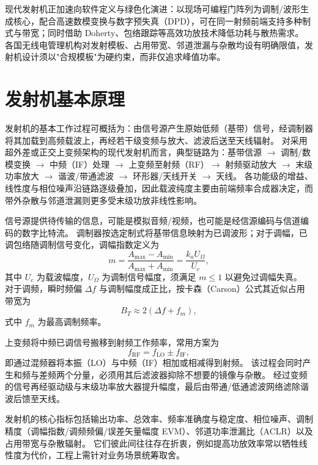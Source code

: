 现代发射机正加速向软件定义与绿色化演进：以现场可编程门阵列为调制/波形生成核心，配合高速数模变换与数字预失真（DPD），可在同一射频前端支持多种制式与带宽；同时借助 Doherty、包络跟踪等高效功放技术降低功耗与散热需求。
各国无线电管理机构对发射模板、占用带宽、邻道泄漏与杂散均设有明确限值，发射机设计须以"合规模板"为硬约束，而非仅追求峰值功率。

\section{发射机基本原理}
\label{sec:transmitter_principle}

发射机的基本工作过程可概括为：由信号源产生原始低频（基带）信号，经调制器将其加载到高频载波上，再经若干级变频与放大、滤波后送至天线辐射。
对采用超外差或正交上变频架构的现代发射机而言，典型链路为：基带信源 $\rightarrow$ 调制/数模变换 $\rightarrow$ 中频（IF）处理 $\rightarrow$ 上变频至射频（RF）$\rightarrow$ 射频驱动放大 $\rightarrow$ 末级功率放大 $\rightarrow$ 谐波/带通滤波 $\rightarrow$ 环形器/天线开关 $\rightarrow$ 天线。
各功能级的增益、线性度与相位噪声沿链路逐级叠加，因此载波纯度主要由前端频率合成器决定，而带外杂散与邻道泄漏则更多受末级功放非线性影响。

信号源提供待传输的信息，可能是模拟音频/视频，也可能是经信源编码与信道编码的数字比特流。
调制器按选定制式将基带信息映射为已调波形；对于调幅，已调包络随调制信号变化，调幅指数定义为
\begin{equation}
m = \frac{A_{\max}-A_{\min}}{A_{\max}+A_{\min}} = \frac{k_a U_{\Omega}}{U_c},
\end{equation}
其中 $U_c$ 为载波幅度，$U_{\Omega}$ 为调制信号幅度，须满足 $m\le 1$ 以避免过调幅失真。
对于调频，瞬时频偏 $\Delta f$ 与调制幅度成正比，按卡森（Carson）公式其近似占用带宽为
\begin{equation}
B_T \approx 2(\Delta f + f_m),
\end{equation}
式中 $f_m$ 为最高调制频率。

上变频将中频已调信号搬移到射频工作频率，常用方案为
\begin{equation}
f_{\mathrm{RF}} = f_{\mathrm{LO}} \pm f_{\mathrm{IF}},
\end{equation}
即通过混频器将本振（LO）与中频（IF）相加或相减得到射频。
该过程会同时产生和频与差频两个分量，必须用其后滤波器抑除不想要的镜像与杂散。
经过变频的信号再经驱动级与末级功率放大器提升幅度，最后由带通/低通滤波网络滤除谐波后馈至天线。

发射机的核心指标包括输出功率、总效率、频率准确度与稳定度、相位噪声、调制精度（调幅指数/调频频偏/误差矢量幅度 EVM）、邻道功率泄漏比（ACLR）以及占用带宽与杂散辐射。
它们彼此间往往存在折衷，例如提高功放效率常以牺牲线性度为代价，工程上需针对业务场景统筹取舍。

